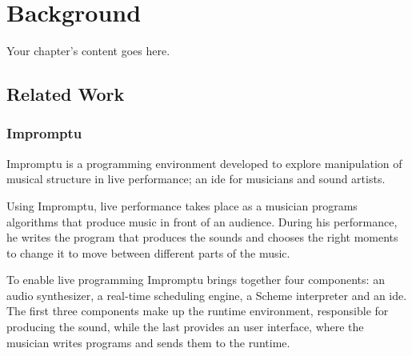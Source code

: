
\chapter{Background}
\label{chapter:background}
Your chapter's content goes here.












\section{Related Work}


\subsection{Impromptu}
\label{section:impromptu:related}
Impromptu\cite{sorensen2005impromptu,sorensen2010programming} is a programming environment developed to explore manipulation of musical structure in live performance; an \gls{ide} for musicians and sound artists.

Using Impromptu, live performance takes place as a musician programs algorithms that produce music in front of an audience.
During his performance, he writes the program that produces the sounds and chooses the right moments to change it to move between different parts of the music.

To enable live programming Impromptu brings together four components: an audio synthesizer, a real-time scheduling engine, a Scheme interpreter and an \gls{ide}.
The first three components make up the runtime environment, responsible for producing the sound, while the last provides an user interface, where the musician writes programs and sends them to the runtime.

